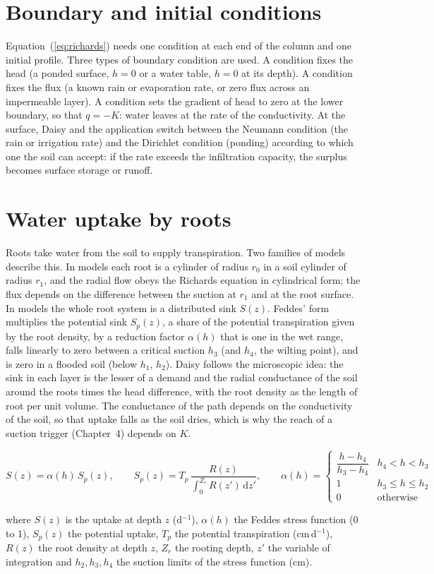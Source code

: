\section{Boundary and initial conditions}
Equation~(\ref{eq:richards}) needs one condition at each end of the column and one initial profile. Three types of boundary condition are used. A  condition fixes the head (a ponded surface, $h=0$ or a water table, $h=0$ at its depth). A  condition fixes the flux (a known rain or evaporation rate, or zero flux across an impermeable layer). A  condition sets the gradient of head to zero at the lower boundary, so that $q=-K$: water leaves at the rate of the conductivity. At the surface, Daisy and the application switch between the Neumann condition (the rain or irrigation rate) and the Dirichlet condition (ponding) according to which one the soil can accept: if the rate exceeds the infiltration capacity, the surplus becomes surface storage or runoff.

\section{Water uptake by roots}
Roots take water from the soil to supply transpiration. Two families of models describe this. In  models each root is a cylinder of radius $r_0$ in a soil cylinder of radius $r_1$, and the radial flow obeys the Richards equation in cylindrical form; the flux depends on the difference between the suction at $r_1$ and at the root surface. In  models the whole root system is a distributed sink $S(z)$. Feddes' form multiplies the potential sink $S_p(z)$, a share of the potential transpiration given by the root density, by a reduction factor $\alpha(h)$ that is one in the wet range, falls linearly to zero between a critical suction $h_3$ (and $h_4$, the wilting point), and is zero in a flooded soil (below $h_1$, $h_2$). Daisy follows the microscopic idea: the sink in each layer is the lesser of a demand and the radial conductance of the soil around the roots times the head difference, with the root density as the length of root per unit volume. The conductance of the path depends on the conductivity of the soil, so that uptake falls as the soil dries, which is why the reach of a suction trigger (Chapter~4) depends on $K$.

\begin{equation}S(z)=\alpha(h)\,S_p(z),\qquad S_p(z)=T_p\,\frac{R(z)}{\int_0^{Z_r}R(z')\,\mathrm dz'},\qquad \alpha(h)=\begin{cases}\dfrac{h-h_4}{h_3-h_4}&h_4<h<h_3\\[4pt]1&h_3\le h\le h_2\\0&\text{otherwise}\end{cases}\label{eq:feddes}\end{equation}
\par\noindent where $S(z)$ is the uptake at depth $z$ (d$^{-1}$), $\alpha(h)$ the Feddes stress function (0 to 1), $S_p(z)$ the potential uptake, $T_p$ the potential transpiration (cm\,d$^{-1}$), $R(z)$ the root density at depth $z$, $Z_r$ the rooting depth, $z'$ the variable of integration and $h_2,h_3,h_4$ the suction limits of the stress function (cm).

